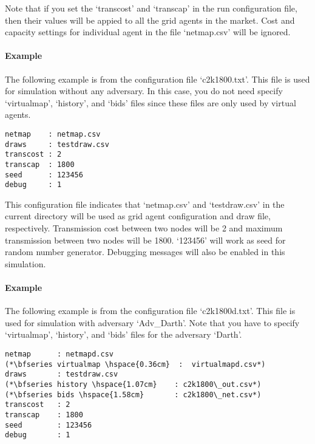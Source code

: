 \documentclass[12pt]{article}
\begin{document}
\noindent
Note that if you set the `transcost' and `transcap' in the run configuration file, 
then their values will be appied to all the grid agents in the market. 
Cost and capacity settings for individual agent in the file `netmap.csv' will be ignored. 

\bigskip
\noindent
\paragraph{Example}
The following example is from the configuration file `c2k1800.txt'.  
This file is used for simulation without any adversary. 
In this case, you do not need specify `virtualmap', `history', and `bids' files 
since these files are only used by virtual agents. 

\bigskip
\noindent
\begin{lstlisting}
netmap    : netmap.csv
draws     : testdraw.csv
transcost : 2
transcap  : 1800 
seed      : 123456
debug     : 1
\end{lstlisting}

\bigskip
\noindent
This configuration file indicates that `netmap.csv' and `testdraw.csv' in the current directory 
will be used as grid agent configuration and draw file, respectively. 
Transmission cost between two nodes will be 2 and maximum transmission between two nodes will be 1800. 
`123456' will work as seed for random number generator. 
Debugging messages will also be enabled in this simulation.  

\bigskip
\noindent
\paragraph{Example}
The following example is from the configuration file `c2k1800d.txt'. 
This file is used for simulation with adversary `Adv\_Darth'. 
Note that you have to specify `virtualmap', `history', and `bids' files 
for the adversary `Darth'. 

\bigskip
\noindent
\begin{lstlisting}
netmap      : netmapd.csv
(*\bfseries virtualmap \hspace{0.36cm}  :  virtualmapd.csv*)
draws       : testdraw.csv
(*\bfseries history \hspace{1.07cm}    : c2k1800\_out.csv*)
(*\bfseries bids \hspace{1.58cm}       : c2k1800\_net.csv*)
transcost   : 2
transcap    : 1800 
seed        : 123456
debug       : 1
\end{lstlisting}
\end{document}
